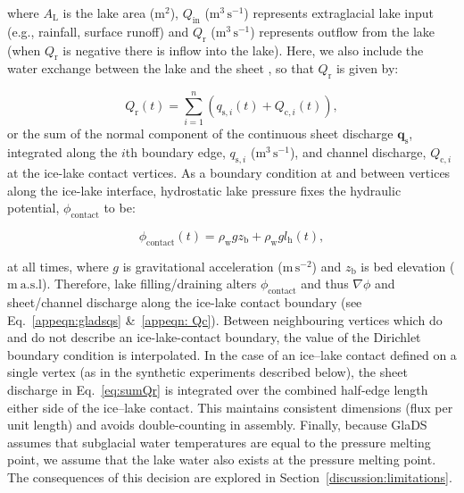 \documentclass[tc, manuscript]{copernicus}
\begin{document}
\noindent
where $A_\mathrm{L}$ is the lake area ($\mathrm{m}^2$), $Q_{\mathrm{in}}$ ($\mathrm{m}^3\, \mathrm{s}^{-1}$) represents extraglacial lake input (e.g., rainfall, surface runoff) and $Q_{\mathrm{r}}$ ($\mathrm{m}^3\, \mathrm{s}^{-1}$) represents outflow from the lake (when $Q_{\mathrm{r}}$ is negative there is inflow into the lake). Here, we also include the water exchange between the lake and the sheet \citep[unlike][who isolated cavities from the lake]{kingslake2013modelling}, so that $Q_{\mathrm{r}}$ is given by:

\begin{equation}
\label{eq:sumQr}
Q_{\mathrm{r}}(t) = \sum_{i=1}^{n} \left( q_{\mathrm{s},i}(t) + Q_{\mathrm{c},i}(t) \right),
\end{equation}
\noindent
or the sum of the normal component of the continuous sheet discharge $\mathbf{q}_{\mathrm{s}}$, integrated along the $i$th boundary edge, $q_{\mathrm{s},i}$  ($\mathrm{m}^{3}\, \mathrm{s}^{-1}$), and channel discharge, $Q_{\mathrm{c},i}$ at the ice-lake contact vertices. As a boundary condition at and between vertices along the ice-lake interface, hydrostatic lake pressure fixes the hydraulic potential, $\phi_{\mathrm{contact}}$ to be: 

\begin{equation}
\label{eq:lakephi}
\phi_{\mathrm{contact}}(t) = \rho_{\mathrm{w}}gz_{\mathrm{b}} + \rho_{\mathrm{w}}gl_{\mathrm{h}}(t) ,
\end{equation}

at all times, where $g$ is gravitational acceleration ($\mathrm{m}\,\mathrm{s}^{-2}$) and $z_{\mathrm{b}}$ is bed elevation ($\mathrm{m \ a.s.l}$). Therefore, lake filling/draining alters $\phi_{\mathrm{contact}}$ and thus $\nabla \phi$ and sheet/channel discharge along the ice-lake contact boundary (see Eq.~\ref{appeqn:gladsqs} \&~\ref{appeqn: Qc}). Between neighbouring vertices which do and do not describe an ice-lake-contact boundary, the value of the Dirichlet boundary condition is interpolated. In the case of an ice--lake contact defined on a single vertex (as in the synthetic experiments described below), the sheet discharge in Eq.~\ref{eq:sumQr} is integrated over the combined half-edge length either side of the ice--lake contact. This maintains consistent dimensions (flux per unit length) and avoids double-counting in assembly. Finally, because GlaDS assumes that subglacial water temperatures are equal to the pressure melting point, we assume that the lake water also exists at the pressure melting point. The consequences of this decision are explored in Section~\ref{discussion:limitations}.
\end{document}
